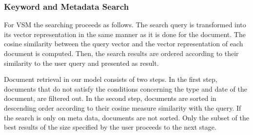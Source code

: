 \subsubsection{Keyword and Metadata Search}\label{sec:keyword_search}

For VSM the searching proceeds as follows. The search query is transformed into its vector representation in the same manner as it is done for the document. The cosine similarity between the query vector and the vector representation of each document is computed. Then, the search results are ordered according to their similarity to the user query and presented as result. 

Document retrieval in our model consists of two steps. In the first step, documents that do not satisfy the conditions concerning the type and date of the document, are filtered out. In the second step, documents are sorted in descending order according to their cosine measure similarity with the query. If the search is only on meta data, documents are not sorted. Only the subset of the best results of the size specified by the user proceeds to the next stage.
